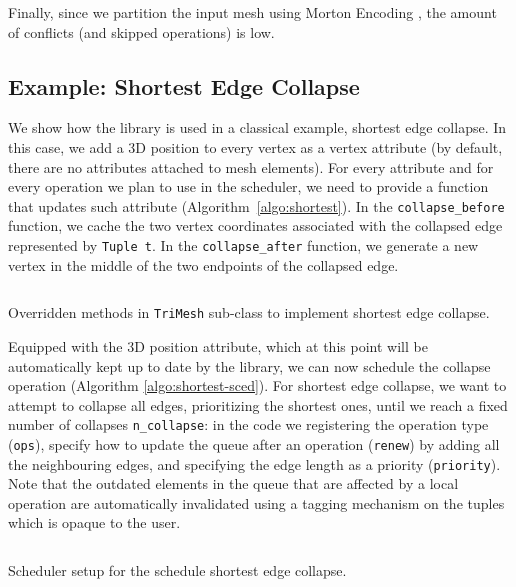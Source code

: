 Finally, since we partition the input mesh using {Morton Encoding} \cite{karras2012maximizing}, the amount of conflicts (and skipped operations) is low.



\subsection{{Example: Shortest Edge Collapse}}

We show how the library is used in a classical example, shortest edge collapse. In this case, we add a 3D position to every vertex as a vertex attribute (by default, there are no attributes attached to mesh elements). For every attribute and for every operation we plan to use in the scheduler, we need to provide a function that updates such attribute (Algorithm~\ref{algo:shortest}). In the \texttt{collapse\_before} function, we cache the two vertex coordinates associated with the collapsed edge represented by \texttt{Tuple t}. In the \texttt{collapse\_after} function, we generate a new vertex in the middle of the two endpoints of the collapsed edge. %

\begin{algorithm}
\inputminted{cpp}{wmtk-tex/code/shortest.cpp}
\caption{Overridden methods in \texttt{TriMesh} sub-class to implement shortest edge collapse.}
\label{algo:shortest}
\end{algorithm}

Equipped with the 3D position attribute, which at this point will be automatically kept up to date by the library, we can now schedule the collapse operation (Algorithm \ref{algo:shortest-sced}). For shortest edge collapse, we want to attempt to collapse all edges, prioritizing the shortest ones, until we reach a fixed number of collapses \texttt{n\_collapse}: in the code we registering the operation type (\texttt{ops}), specify how to update the queue after an operation (\texttt{renew}) by adding all the neighbouring edges, and specifying the edge length as a priority (\texttt{priority}). Note that the {outdated} elements in the queue that are affected by a local operation are automatically invalidated using a tagging mechanism on the tuples which is opaque to the user.

\begin{algorithm}
\inputminted{cpp}{wmtk-tex/code/shortest-sched.cpp}
\caption{Scheduler setup for the schedule shortest edge collapse.}
\label{algo:shortest-sced}
\end{algorithm}